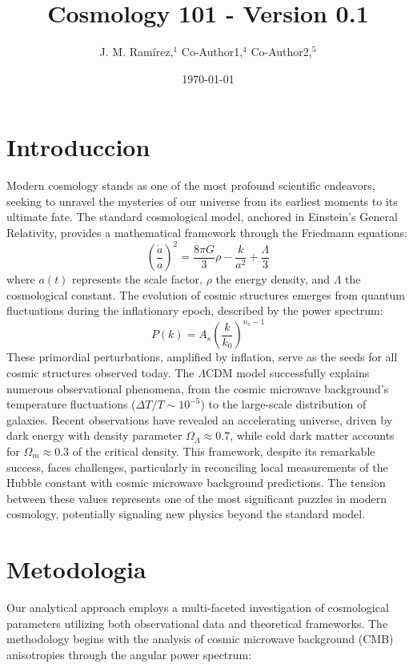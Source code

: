 \documentclass{article}\usepackage{graphicx} \usepackage{amsmath} \usepackage{colortbl}\title{Cosmology 101 - Version 0.1}
\author{J. M. Ram{\'i}rez,$^{1}$ Co-Author1,$^{4}$ Co-Author2,$^{5}$}
\date{\today}
\begin{document}
\maketitle\section{Introduccion}
Modern cosmology stands as one of the most profound scientific endeavors, seeking to unravel the mysteries of our universe from its earliest moments to its ultimate fate. The standard cosmological model, anchored in Einstein's General Relativity, provides a mathematical framework through the Friedmann equations:  
\begin{equation} \left(\frac{\dot{a}}{a}\right)^2 = \frac{8\pi G}{3}\rho - \frac{k}{a^2} + \frac{\Lambda}{3}
\end{equation}  
where $a(t)$ represents the scale factor, $\rho$ the energy density, and $\Lambda$ the cosmological constant. The evolution of cosmic structures emerges from quantum fluctuations during the inflationary epoch, described by the power spectrum:  
\begin{equation} P(k) = A_s\left(\frac{k}{k_0}\right)^{n_s-1} 
\end{equation}  
These primordial perturbations, amplified by inflation, serve as the seeds for all cosmic structures observed today. The $\Lambda$CDM model successfully explains numerous observational phenomena, from the cosmic microwave background's temperature fluctuations ($\Delta T/T \sim 10^{-5}$) to the large-scale distribution of galaxies. Recent observations have revealed an accelerating universe, driven by dark energy with density parameter $\Omega_\Lambda \approx 0.7$, while cold dark matter accounts for $\Omega_m \approx 0.3$ of the critical density. This framework, despite its remarkable success, faces challenges, particularly in reconciling local measurements of the Hubble constant with cosmic microwave background predictions. The tension between these values represents one of the most significant puzzles in modern cosmology, potentially signaling new physics beyond the standard model.\section{Metodologia}
Our analytical approach employs a multi-faceted investigation of cosmological parameters utilizing both observational data and theoretical frameworks. The methodology begins with the analysis of cosmic microwave background (CMB) anisotropies through the angular power spectrum:  
\end{document}
